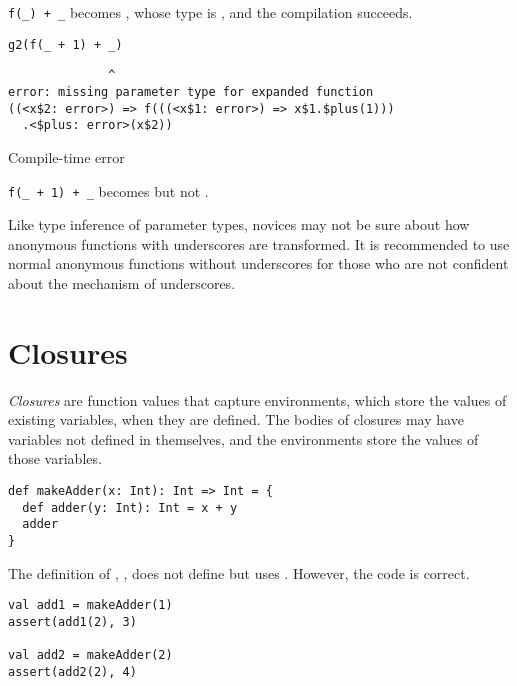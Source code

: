 \verb!f(_) + _! becomes , whose type is , and the compilation succeeds.

\begin{verbatim}
g2(f(_ + 1) + _)
\end{verbatim}
\vspace{-1em}
\begin{mdframed}[hidealllines=true,backgroundcolor=red!10,innerleftmargin=3pt,innerrightmargin=3pt,leftmargin=-3pt,rightmargin=-3pt]
\begin{verbatim}
              ^
error: missing parameter type for expanded function
((<x$2: error>) => f(((<x$1: error>) => x$1.$plus(1)))
  .<$plus: error>(x$2))
\end{verbatim}
\vspace{-2em}
\begin{flushright}
\scriptsize\textsf{Compile-time error}
\end{flushright}
\end{mdframed}

\verb!f(_ + 1) + _! becomes
 but not .

Like type inference of parameter types, novices may not be sure about how
anonymous functions with underscores are transformed. It is recommended to use normal anonymous
functions without underscores for those who are not confident about the mechanism
of underscores.

\section{Closures}

\textit{Closures} are function values that capture
environments, which store the values of existing variables, when they are defined.
The bodies of closures may
have variables not defined in themselves, and the environments store the values
of those variables.

\begin{verbatim}
def makeAdder(x: Int): Int => Int = {
  def adder(y: Int): Int = x + y
  adder
}
\end{verbatim}

The definition of , , does not
define but uses . However, the code is correct.

\begin{verbatim}
val add1 = makeAdder(1)
assert(add1(2), 3)

val add2 = makeAdder(2)
assert(add2(2), 4)
\end{verbatim}

